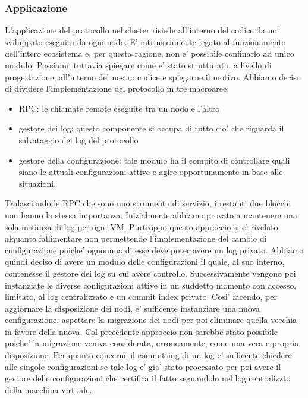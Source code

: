 \subsubsection{Applicazione}
L'applicazione del protocollo nel cluster risiede all'interno del codice da noi sviluppato
eseguito da ogni nodo. E' intrinsicamente legato al funzionamento dell'intero ecosistema e, per 
questa ragione, non e' possibile confinarlo ad unico modulo. 
Possiamo tuttavia spiegare come e' stato strutturato, a livello di progettazione, all'interno
del nostro codice e spiegarne il motivo.
Abbiamo deciso di dividere l'implementazione del protocollo in tre macroaree:
\begin{itemize}
    \item RPC: le chiamate remote eseguite tra un nodo e l'altro
    \item gestore dei log: questo componente si occupa di tutto cio' che riguarda il salvataggio 
        dei log del protocollo
    \item gestore della configurazione: tale modulo ha il compito di controllare quali siano 
        le attuali configurazioni attive e agire opportunamente in base alle situazioni.
\end{itemize}
Tralasciando le RPC che sono uno strumento di servizio, i restanti due blocchi non hanno la stessa
importanza. Inizialmente abbiamo provato a mantenere una sola instanza di log per ogni
VM. Purtroppo questo approccio si e' rivelato alquanto fallimentare non permettendo
l'implementazione del cambio di configurazione poiche' ognonuna di esse deve 
poter avere un log privato.
Abbiamo quindi deciso di avere un modulo delle configurazioni il quale, al suo interno, contenesse
il gestore dei log su cui avere controllo.
Successivamente vengono poi instanziate le diverse configurazioni attive in un suddetto momento
con accesso, limitato, al log centralizzato e un commit index privato. 
Cosi' facendo, per aggiornare la disposizione dei nodi, e' sufficente instanziare una
nuova configurazione, aspettare la migrazione dei nodi per poi eliminare quella vecchia in favore 
della nuova. Col precedente approccio non sarebbe stato possibile poiche' la migrazione veniva 
considerata, erroneamente, come una vera e propria disposizione. 
Per quanto concerne il committing di un log e' sufficente chiedere alle singole configurazioni
se tale log e' gia' stato processato per poi avere il gestore delle configurazioni che certifica
il fatto segnandolo nel log centralizzto della macchina virtuale.


